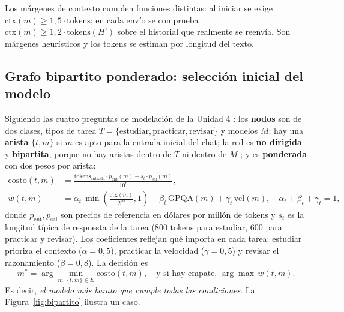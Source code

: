\documentclass[12pt,letterpaper]{article}
\begin{document}
Los márgenes de contexto cumplen funciones distintas: al iniciar se exige $\mathrm{ctx}(m)\ge 1{,}5\cdot\mathrm{tokens}$; en cada envío se comprueba $\mathrm{ctx}(m)\ge 1{,}2\cdot\mathrm{tokens}(H')$ sobre el historial que realmente se reenvía. Son márgenes heurísticos y los tokens se estiman por longitud del texto.

\subsection{Grafo bipartito ponderado: selección inicial del modelo}
Siguiendo las cuatro preguntas de modelación de la Unidad 4 \parencite{gomez2026redes}: los \textbf{nodos} son de dos clases, tipos de tarea $T=\{\text{estudiar},\text{practicar},\text{revisar}\}$ y modelos $M$; hay una \textbf{arista} $\{t,m\}$ si $m$ es apto para la entrada inicial del chat; la red es \textbf{no dirigida} y \textbf{bipartita}, porque no hay aristas dentro de $T$ ni dentro de $M$ \parencite{gomez2026grafos,gutierrez2024grafos}; y es \textbf{ponderada} con dos pesos por arista:
\begin{align}
\mathrm{costo}(t,m) &= \frac{\text{tokens}_{\text{entrada}}\cdot p_{\text{ent}}(m)+s_t\cdot p_{\text{sal}}(m)}{10^{6}},\\
w(t,m) &= \alpha_t\,\min\!\left(\frac{\mathrm{ctx}(m)}{2^{20}},1\right)+\beta_t\,\mathrm{GPQA}(m)+\gamma_t\,\mathrm{vel}(m),\quad \alpha_t+\beta_t+\gamma_t=1,
\end{align}
donde $p_{\text{ent}},p_{\text{sal}}$ son precios de referencia en dólares por millón de tokens \parencite{openrouter2026} y $s_t$ es la longitud típica de respuesta de la tarea (800 tokens para estudiar, 600 para practicar y revisar). Los coeficientes reflejan qué importa en cada tarea: estudiar prioriza el contexto ($\alpha=0{,}5$), practicar la velocidad ($\gamma=0{,}5$) y revisar el razonamiento ($\beta=0{,}8$). La decisión es
\begin{equation}
m^{*}=\arg\min_{m:\,\{t,m\}\in E}\mathrm{costo}(t,m),\quad\text{y si hay empate, }\arg\max\, w(t,m).
\end{equation}
Es decir, \emph{el modelo más barato que cumple todas las condiciones}. La Figura~\ref{fig:bipartito} ilustra un caso.
\end{document}

